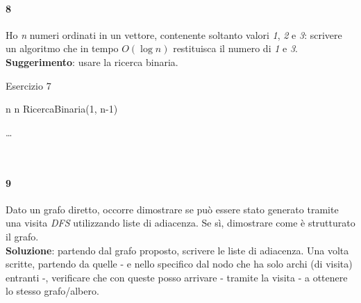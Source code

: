 \paragraph{8}
Ho \textit{n} numeri ordinati in un vettore, contenente soltanto valori \textit{1}, \textit{2} e \textit{3}: scrivere un algoritmo che in tempo $O(\log{n})$ restituisca il numero di \textit{1} e \textit{3}. \\
\textbf{Suggerimento}: usare la ricerca binaria.
\begin{algorithm}
	\caption{Esercizio 7}\label{alg:es8}
	\begin{algorithmic}[1]
		\Return n
		\EndIf
		\Return n
		\EndIf
		\Return RicercaBinaria(1, n-1)
		\EndFunction
	\end{algorithmic}
	\begin{algorithmic}[1]
		\State \ldots
		\EndFunction
	\end{algorithmic}
\end{algorithm} \\ \hfill

\paragraph{9}
Dato un grafo diretto, occorre dimostrare se può essere stato generato tramite una visita \textit{DFS} utilizzando liste di adiacenza. Se sì, dimostrare come è strutturato il grafo. \\
\textbf{Soluzione}: partendo dal grafo proposto, scrivere le liste di adiacenza. Una volta scritte, partendo da quelle - e nello specifico dal nodo che ha solo archi (di visita) entranti -, verificare che con queste posso arrivare - tramite la visita - a ottenere lo stesso grafo/albero.
\newpage

